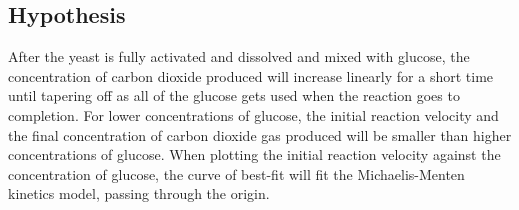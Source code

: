 \documentclass{article}
\begin{document}
\subsection{Hypothesis}
After the yeast is fully activated and dissolved and mixed with glucose, the concentration of carbon dioxide produced will increase linearly for a short time until tapering off as all of the glucose gets used when the reaction goes to completion. For lower concentrations of glucose, the initial reaction velocity and the final concentration of carbon dioxide gas produced will be smaller than higher concentrations of glucose. When plotting the initial reaction velocity against the concentration of glucose, the curve of best-fit will fit the Michaelis-Menten kinetics model, passing through the origin.

\end{document}
